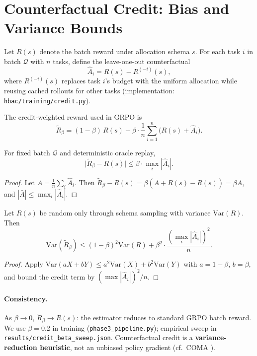 \section{Counterfactual Credit: Bias and Variance Bounds}
\label{app:theory}

Let $R(s)$ denote the batch reward under allocation schema $s$.
For each task $i$ in batch $\mathcal{Q}$ with $n$ tasks, define the leave-one-out counterfactual
\[
  \hat{A}_i = R(s) - R^{(-i)}(s),
\]
where $R^{(-i)}(s)$ replaces task $i$'s budget with the uniform allocation while reusing cached rollouts for other tasks (implementation: \texttt{hbac/training/credit.py}).

The credit-weighted reward used in GRPO is
\[
  \tilde{R}_\beta = (1-\beta)\, R(s) + \beta \cdot \frac{1}{n}\sum_{i=1}^n \bigl(R(s) + \hat{A}_i\bigr).
\]

\begin{proposition}
For fixed batch $\mathcal{Q}$ and deterministic oracle replay,
\[
  \bigl|\tilde{R}_\beta - R(s)\bigr| \le \beta \cdot \max_i |\hat{A}_i|.
\]
\end{proposition}

\begin{proof}
Let $\bar{A} = \frac{1}{n}\sum_i \hat{A}_i$. Then
$\tilde{R}_\beta - R(s) = \beta(\bar{A} + R(s) - R(s)) = \beta \bar{A}$,
and $|\bar{A}| \le \max_i |\hat{A}_i|$.
\end{proof}

\begin{proposition}
Let $R(s)$ be random only through schema sampling with variance $\mathrm{Var}(R)$.
Then
\[
  \mathrm{Var}(\tilde{R}_\beta) \le (1-\beta)^2 \mathrm{Var}(R) + \beta^2 \cdot \frac{(\max_i |\hat{A}_i|)^2}{n}.
\]
\end{proposition}

\begin{proof}
Apply $\mathrm{Var}(aX + bY) \le a^2\mathrm{Var}(X) + b^2\mathrm{Var}(Y)$ with
$a=1-\beta$, $b=\beta$, and bound the credit term by $(\max |\hat{A}_i|)^2/n$.
\end{proof}

\paragraph{Consistency.}
As $\beta \to 0$, $\tilde{R}_\beta \to R(s)$: the estimator reduces to standard GRPO batch reward.
We use $\beta=0.2$ in training (\texttt{phase3\_pipeline.py}); empirical sweep in \texttt{results/credit\_beta\_sweep.json}.
Counterfactual credit is a \textbf{variance-reduction heuristic}, not an unbiased policy gradient (cf.\ COMA \citep{foerster2018coma}).
